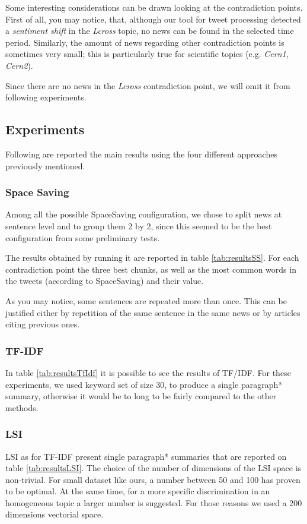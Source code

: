 Some interesting considerations can be drawn looking at the contradiction points.
First of all, you may notice, that, although our tool for tweet processing detected a \emph{sentiment
shift} in the \emph{Lcross} topic, no news can be found in the selected time period.
Similarly, the amount of news regarding other contradiction points is sometimes
very small; this is particularly true for scientific topics (e.g. \emph{Cern1},
\emph{Cern2}).

Since there are no news in the \emph{Lcross} contradiction point, we will omit it from following
experiments.

\subsection*{Experiments}
Following are reported the main results using the four different approaches previously mentioned.
\subsubsection*{Space Saving}
Among all the possible SpaceSaving configuration, we chose to split news at
sentence level and to group them 2 by 2, since this seemed to be the best
configuration from some preliminary tests.

The results obtained by running it are reported in table \ref{tab:resultsSS}. For
each contradiction point the three best chunks, as well as the most
common words in the tweets (according to SpaceSaving) and their value.

As you may notice, some sentences are repeated more than once. This can be
justified either by repetition of the same sentence in the same news or by
articles citing previous ones.

\subsubsection*{TF-IDF}
In table \ref{tab:resultsTfIdf} it is possible to see the results of TF/IDF. For these experiments, we used keyword set of size 30, to produce a single paragraph* summary, otherwise it would be to long to be fairly compared to the other methods.

\subsubsection*{LSI}
LSI as for TF-IDF present single paragraph* summaries that are reported on table \ref{tab:resultsLSI}. The choice of the number of dimensions of the LSI space is non-trivial. For small dataset like ours, a number between 50 and 100 has proven to be optimal\cite{LSA2}. At the same time, for a more specific discrimination in an homogeneous topic a larger number is suggested. For those reasons we used a 200 dimensions vectorial space.

